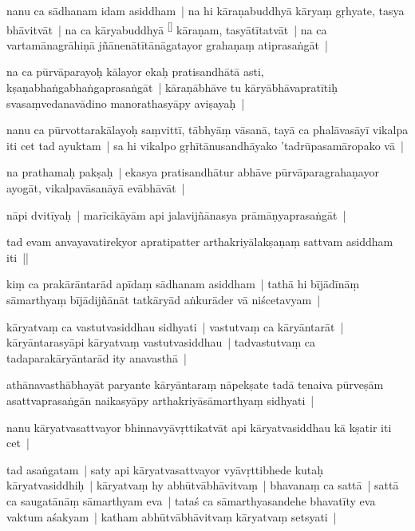 \documentclass[article,a4paper]{memoir}
\begin{document}
	  \pstart nanu ca sā\-dhanam idam asiddham | na hi kā\-raṇabuddhyā\- kā\-ryaṃ gṛhyate, tasya bhā\-vitvā\-t | na ca kā\-ryabuddhyā\- \leavevmode\textsuperscript{\rmlatinfont\tiny [\cite[39b]{RNAms}]} kā\-raṇam, tasyā\-tī\-tatvā\-t | na ca vartamā\-nagrā\-hiṇā\- jñā\-nenā\-tī\-tā\-nā\-gatayor grahaṇaṃ atiprasaṅgā\-t |
	\pend
      

	  \pstart na ca pū\-rvā\-parayoḥ kā\-layor ekaḥ pratisandhā\-tā\- asti, kṣaṇabhaṅgabhaṅgaprasaṅgā\-t | kā\-raṇā\-bhā\-ve tu kā\-ryā\-bhā\-vapratī\-tiḥ svasaṃvedanavā\-dino manorathasyā\-py aviṣayaḥ |
	\pend
      

	  \pstart nanu ca pū\-rvottarakā\-layoḥ saṃvittī\-, tā\-bhyā\-ṃ vā\-sanā\-, tayā\- ca phalā\-vasā\-yī\- vikalpa iti cet tad ayuktam | sa hi vikalpo gṛhī\-tā\-nusandhā\-yako 'tadrū\-pasamā\-ropako vā\- |
	\pend
      

	  \pstart na prathamaḥ pakṣaḥ | ekasya pratisandhā\-tur abhā\-ve pū\-rvā\-paragrahaṇayor ayogā\-t, vikalpavā\-sanā\-yā\- evā\-bhā\-vā\-t |
	\pend
      

	  \pstart nā\-pi dvitī\-yaḥ | marī\-cikā\-yā\-m api jalavijñā\-nasya prā\-mā\-ṇyaprasaṅgā\-t |
	\pend
      

	  \pstart tad evam anvayavatirekyor apratipatter arthakriyā\-lakṣaṇaṃ sattvam asiddham iti || 
	\pend
      

	  \pstart kiṃ ca prakā\-rā\-ntarā\-d apī\-daṃ sā\-dhanam asiddham | tathā\- hi bī\-jā\-dī\-nā\-ṃ sā\-marthyaṃ bī\-jā\-dijñā\-nā\-t tatkā\-ryā\-d aṅkurā\-der vā\- niścetavyam |
	\pend
      

	  \pstart kā\-ryatvaṃ ca vastutvasiddhau sidhyati | vastutvaṃ ca kā\-ryā\-ntarā\-t | kā\-ryā\-ntarasyā\-pi kā\-ryatvaṃ vastutvasiddhau | tadvastutvaṃ ca tadaparakā\-ryā\-ntarā\-d ity anavasthā\- |
	\pend
      

	  \pstart athā\-navasthā\-bhayā\-t paryante kā\-ryā\-ntaraṃ nā\-pekṣate tadā\- tenaiva pū\-rveṣā\-m asattvaprasaṅgā\-n naikasyā\-py arthakriyā\-sā\-marthyaṃ sidhyati |
	\pend
      

	  \pstart nanu kā\-ryatvasattvayor bhinnavyā\-vṛttikatvā\-t  api kā\-ryatvasiddhau kā\- kṣatir iti cet |
	\pend
      

	  \pstart tad asaṅgatam | saty api kā\-ryatvasattvayor vyā\-vṛttibhede  kutaḥ kā\-ryatvasiddhiḥ | kā\-ryatvaṃ hy abhū\-tvā\-bhā\-vitvaṃ | bhavanaṃ ca sattā\- | sattā\- ca saugatā\-nā\-ṃ sā\-marthyam eva | tataś ca sā\-marthyasandehe bhavatī\-ty eva vaktum aśakyam | katham abhū\-tvā\-bhā\-vitvaṃ kā\-ryatvaṃ setsyati |
	\pend
      
\end{document}
